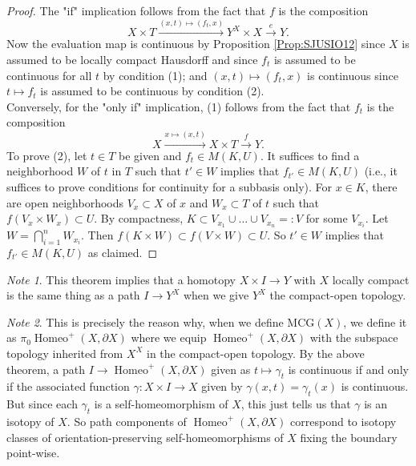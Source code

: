 \documentclass[reqno]{amsart}
\theoremstyle{definition}
\theoremstyle{remark}
\newtheorem*{note}{Note}
\DeclareMathOperator{\Homeo}{Homeo}
\newcommand{\MCG}{{\mathrm{MCG}}}
\begin{document}
\begin{proof}
    The "if" implication follows from the fact
    that $f$ is the composition
    \[
    X \times T \stackrel{\left( x,t \right) \mapsto 
    \left( f_t, x \right) }{\longrightarrow} Y^{X} \times X
    \stackrel{e}{\to} Y.
    \] 
    Now the evaluation map is continuous
    by Proposition \ref{Prop:SJUSIO12} since
    $X$ is assumed to be locally compact Hausdorff and
    since $f_t$ is assumed to
    be continuous for all $t$ by condition (1); and
    $\left( x,t \right) \mapsto \left( f_t, x \right) $ 
    is continuous since 
    $t \mapsto f_t$ is assumed to be continuous
    by condition (2).\\
    Conversely, for the "only if" implication,
    (1) follows from the fact that $f_t$ is the
    composition
    \[
    X \stackrel{x \mapsto (x,t)}{\to} X \times T
    \stackrel{f}{\to} Y.
    \] 
    To prove (2), let
    $t \in T$ be given and
    $f_t \in M\left( K, U \right) $. It suffices
    to find a neighborhood $W$ of $t$ in $T$ such that
    $t' \in W$ implies that
    $f_{t'} \in M\left( K,U \right) $ (i.e., it suffices to
    prove conditions for continuity for a subbasis only).
    For $x \in K$, there are open neighborhoods $V_x \subset 
    X$ of $x$ and $W_x \subset T$ of $t$ such that
    $f\left( V_x \times W_x \right) \subset U$.
    By compactness, $K \subset 
    V_{x_1} \cup  \ldots \cup  V_{x_n} =: V$ for
    some $V_{x_i}$. Let
    $W = \bigcap_{i=1}^{n} W_{x_i}$. Then
    $f\left( K \times W \right) \subset 
    f\left( V \times W \right)  \subset U$.
    So $t' \in W$ implies that
    $f_{t'} \in M\left( K,U \right) $ as claimed.
\end{proof}

\begin{note}
    This theorem implies that
    a homotopy $X \times I \to Y$ with $X$ locally
    compact is the same thing as a path
    $I \to Y^{X}$ when we give
    $Y^{X}$ the compact-open topology.
\end{note}

\begin{note}
    This is precisely the reason why, when we define
    $\MCG (X)$, we define it as
    $\pi_0 \Homeo^{+}(X, \partial X)$ where we equip
    $\Homeo^{+}\left( X, \partial X \right) $ with the
    subspace topology inherited from
    $X^{X}$ in the compact-open topology.
    By the above theorem, a path 
    $I \to \Homeo^{+} \left( X, \partial X \right) $ 
    given as $t \mapsto \gamma_t$
    is continuous if and only if
    the associated function
    $\gamma \colon X \times I \to X$ given
    by $\gamma(x,t) = \gamma_t(x)$ is
    continuous. But since each
    $\gamma_t$ is a self-homeomorphism of $X$, this
    just tells us that $\gamma$ is an isotopy of
    $X$. So path components
    of $\Homeo^{+} \left( X , \partial X \right) $ 
    correspond to isotopy classes of orientation-preserving
    self-homeomorphisms of $X$ fixing the boundary point-wise.
\end{note}
\end{document}
